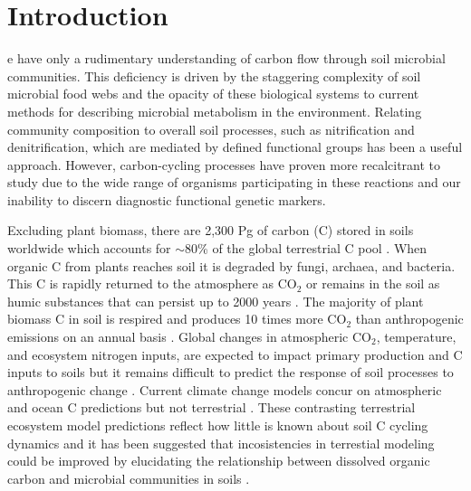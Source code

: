 \section{Introduction}
e have only a rudimentary understanding of carbon flow through soil
microbial communities. This deficiency is driven by the staggering complexity
of soil microbial food webs and the opacity of these biological systems to
current methods for describing microbial metabolism in the environment.
Relating community composition to overall soil processes, such as nitrification
and denitrification, which are mediated by defined functional groups has been a
useful approach. However, carbon-cycling processes have proven more
recalcitrant to study due to the wide range of organisms participating in these
reactions and our inability to discern diagnostic functional genetic markers.

Excluding plant biomass, there are 2,300 Pg of carbon (C) stored in soils
worldwide which accounts for $\sim$80\% of the global terrestrial C pool
\citep{Amundson_2001,BATJES_1996}. When organic C from plants reaches soil it
is degraded by fungi, archaea, and bacteria. This C is rapidly returned to the
atmosphere as CO$_{2}$ or remains in the soil as humic substances that can
persist up to 2000 years \citep{yanagita1990natural}. The majority of plant
biomass C in soil is respired and produces 10 times more CO$_{2}$ than
anthropogenic emissions on an annual basis \citep{chapin2002principles}. Global
changes in atmospheric CO$_{2}$, temperature, and ecosystem nitrogen inputs,
are expected to impact primary production and C inputs to soils
\citep{Groenigen_2006} but it remains difficult to predict the response of soil
processes to anthropogenic change \citep{DAVIDSON_2006}. Current climate change
models concur on atmospheric and ocean C predictions but not terrestrial
\citep{Friedlingstein_2006}. These contrasting terrestrial ecosystem model
predictions reflect how little is known about soil C cycling dynamics and it
has been suggested that incosistencies in terrestial modeling could be improved
by elucidating the relationship between dissolved organic carbon and microbial
communities in soils \citep{Neff_2001}. 

